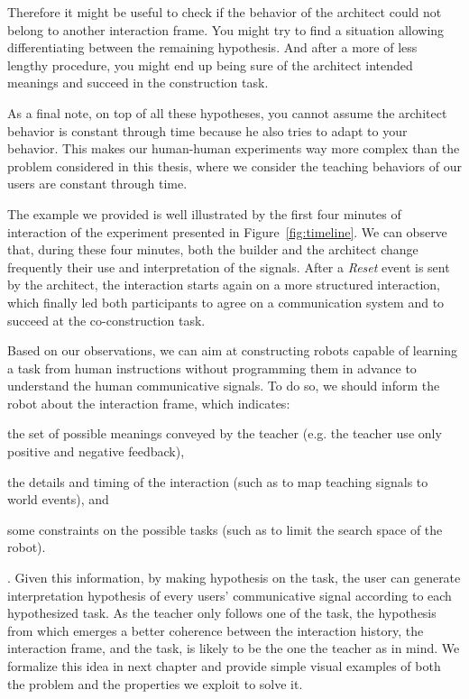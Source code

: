 Therefore it might be useful to check if the behavior of the architect could not belong to another interaction frame. You might try to find a situation allowing differentiating between the remaining hypothesis. And after a more of less lengthy procedure, you might end up being sure of the architect intended meanings and succeed in the construction task.

As a final note, on top of all these hypotheses, you cannot assume the architect behavior is constant through time because he also tries to adapt to your behavior. This makes our human-human experiments way more complex than the problem considered in this thesis, where we consider the teaching behaviors of our users are constant through time.

The example we provided is well illustrated by the first four minutes of interaction of the experiment presented in Figure~\ref{fig:timeline}. We can observe that, during these four minutes, both the builder and the architect change frequently their use and interpretation of the signals. After a \emph{Reset} event is sent by the architect, the interaction starts again on a more structured interaction, which finally led both participants to agree on a communication system and to succeed at the co-construction task.

\transition

Based on our observations, we can aim at constructing robots capable of learning a task from human instructions without programming them in advance to understand the human communicative signals. To do so, we should inform the robot about the interaction frame, which indicates: \begin{inparaenum}[(a)] \item the set of possible meanings conveyed by the teacher (e.g. the teacher use only positive and negative feedback), \item the details and timing of the interaction (such as to map teaching signals to world events), and \item some constraints on the possible tasks (such as to limit the search space of the robot). \end{inparaenum}. Given this information, by making hypothesis on the task, the user can generate interpretation hypothesis of every users' communicative signal according to each hypothesized task. As the teacher only follows one of the task, the hypothesis from which emerges a better coherence between the interaction history, the interaction frame, and the task, is likely to be the one the teacher as in mind. We formalize this idea in next chapter and provide simple visual examples of both the problem and the properties we exploit to solve it.




